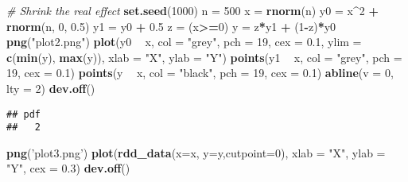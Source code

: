 \documentclass[]{article}
\newenvironment{Shaded}{\begin{snugshade}}{\end{snugshade}}
\newcommand{\KeywordTok}[1]{\textcolor[rgb]{0.13,0.29,0.53}{\textbf{#1}}}
\newcommand{\DataTypeTok}[1]{\textcolor[rgb]{0.13,0.29,0.53}{#1}}
\newcommand{\DecValTok}[1]{\textcolor[rgb]{0.00,0.00,0.81}{#1}}
\newcommand{\FloatTok}[1]{\textcolor[rgb]{0.00,0.00,0.81}{#1}}
\newcommand{\StringTok}[1]{\textcolor[rgb]{0.31,0.60,0.02}{#1}}
\newcommand{\CommentTok}[1]{\textcolor[rgb]{0.56,0.35,0.01}{\textit{#1}}}
\newcommand{\OperatorTok}[1]{\textcolor[rgb]{0.81,0.36,0.00}{\textbf{#1}}}
\newcommand{\NormalTok}[1]{#1}
\begin{document}
\begin{Shaded}
\begin{Highlighting}[]
\CommentTok{# Shrink the real effect}
\KeywordTok{set.seed}\NormalTok{(}\DecValTok{1000}\NormalTok{)}
\NormalTok{n   =}\StringTok{ }\DecValTok{500}
\NormalTok{x   =}\StringTok{ }\KeywordTok{rnorm}\NormalTok{(n)}
\NormalTok{y0  =}\StringTok{ }\NormalTok{x}\OperatorTok{^}\DecValTok{2} \OperatorTok{+}\StringTok{ }\KeywordTok{rnorm}\NormalTok{(n, }\DecValTok{0}\NormalTok{, }\FloatTok{0.5}\NormalTok{)}
\NormalTok{y1  =}\StringTok{ }\NormalTok{y0 }\OperatorTok{+}\StringTok{ }\FloatTok{0.5}
\NormalTok{z   =}\StringTok{ }\NormalTok{(x}\OperatorTok{>=}\DecValTok{0}\NormalTok{)}
\NormalTok{y   =}\StringTok{ }\NormalTok{z}\OperatorTok{*}\NormalTok{y1 }\OperatorTok{+}\StringTok{ }\NormalTok{(}\DecValTok{1}\OperatorTok{-}\NormalTok{z)}\OperatorTok{*}\NormalTok{y0}
\KeywordTok{png}\NormalTok{(}\StringTok{"plot2.png"}\NormalTok{)}
\KeywordTok{plot}\NormalTok{(y0 }\OperatorTok{~}\StringTok{ }\NormalTok{x, }\DataTypeTok{col =} \StringTok{"grey"}\NormalTok{, }\DataTypeTok{pch =} \DecValTok{19}\NormalTok{, }\DataTypeTok{cex =} \FloatTok{0.1}\NormalTok{,}
     \DataTypeTok{ylim =} \KeywordTok{c}\NormalTok{(}\KeywordTok{min}\NormalTok{(y), }\KeywordTok{max}\NormalTok{(y)),}
     \DataTypeTok{xlab =} \StringTok{"X"}\NormalTok{, }\DataTypeTok{ylab =} \StringTok{"Y"}\NormalTok{)}
\KeywordTok{points}\NormalTok{(y1 }\OperatorTok{~}\StringTok{ }\NormalTok{x, }\DataTypeTok{col =} \StringTok{"grey"}\NormalTok{, }\DataTypeTok{pch =} \DecValTok{19}\NormalTok{, }\DataTypeTok{cex =} \FloatTok{0.1}\NormalTok{)}
\KeywordTok{points}\NormalTok{(y }\OperatorTok{~}\StringTok{ }\NormalTok{x, }\DataTypeTok{col =} \StringTok{"black"}\NormalTok{, }\DataTypeTok{pch =} \DecValTok{19}\NormalTok{, }\DataTypeTok{cex =} \FloatTok{0.1}\NormalTok{)}
\KeywordTok{abline}\NormalTok{(}\DataTypeTok{v =} \DecValTok{0}\NormalTok{, }\DataTypeTok{lty =} \DecValTok{2}\NormalTok{)}
\KeywordTok{dev.off}\NormalTok{()}
\end{Highlighting}
\end{Shaded}

\begin{verbatim}
## pdf 
##   2
\end{verbatim}

\begin{Shaded}
\begin{Highlighting}[]
\KeywordTok{png}\NormalTok{(}\StringTok{'plot3.png'}\NormalTok{)}
\KeywordTok{plot}\NormalTok{(}\KeywordTok{rdd_data}\NormalTok{(}\DataTypeTok{x=}\NormalTok{x, }\DataTypeTok{y=}\NormalTok{y,}\DataTypeTok{cutpoint=}\DecValTok{0}\NormalTok{), }
     \DataTypeTok{xlab =} \StringTok{"X"}\NormalTok{, }\DataTypeTok{ylab =} \StringTok{"Y"}\NormalTok{, }\DataTypeTok{cex =} \FloatTok{0.3}\NormalTok{)}
\KeywordTok{dev.off}\NormalTok{()}
\end{Highlighting}
\end{Shaded}
\end{document}
